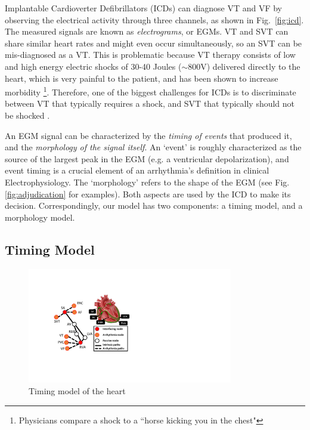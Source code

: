 Implantable Cardioverter Defibrillators (ICDs) can diagnose VT and VF by observing the electrical activity through three channels, as shown in Fig.~\ref{fig:icd}.
The measured signals are known as \emph{electrograms}, or EGMs.
VT and SVT can share similar heart rates and might even occur simultaneously, so an SVT can be mis-diagnosed as a VT. 
This is problematic because VT therapy consists of low and high energy electric shocks of 30-40 Joules ($\sim$800V) delivered directly to the heart, which is very painful to the patient, and has been shown to increase morbidity \cite{shock_mortality}\footnote{\small{Physicians compare a shock to a ``horse kicking you in the chest"}}.
Therefore, one of the biggest challenges for ICDs is to discriminate between VT that typically requires a shock, and SVT that typically should not be shocked \cite{Ellenbogen11_Pacingbook}.

An EGM signal can be characterized by the \emph{timing of events} that produced it, and the \emph{morphology of the signal itself}.
An `event' is roughly characterized as the source of the largest peak in the EGM (e.g. a ventricular depolarization), and event timing is a crucial element of an arrhythmia's definition in clinical Electrophysiology.
The `morphology' refers to the shape of the EGM (see Fig. \ref{fig:adjudication} for examples).
Both aspects are used by the ICD to make its decision.
Correspondingly, our model has two components: a timing model, and a morphology model.

\subsection{Timing Model}
\begin{figure}[t]
	\centering
	\includegraphics[width=0.8\textwidth]{figs/HM_top.pdf}
	\caption{\small Timing model of the heart}
	\label{fig:HM_top}
\end{figure}


